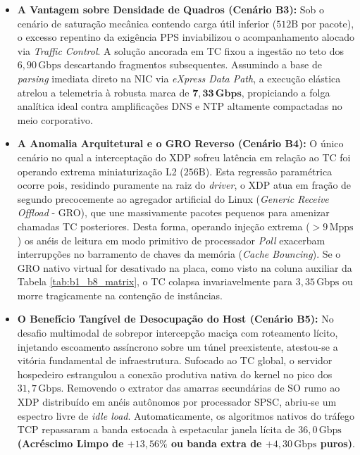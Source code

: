 \documentclass[conference]{IEEEtran}
\begin{document}
\begin{itemize}
    \item \textbf{A Vantagem sobre Densidade de Quadros (Cenário B3):} Sob o cenário de saturação mecânica contendo carga útil inferior ($512\text{B}$ por pacote), o excesso repentino da exigência PPS inviabilizou o acompanhamento alocado via \textit{Traffic Control}. A solução ancorada em TC fixou a ingestão no teto dos $6,90\,\text{Gbps}$ descartando fragmentos subsequentes. Assumindo a base de \textit{parsing} imediata direto na NIC via \textit{eXpress Data Path}, a execução elástica atrelou a telemetria à robusta marca de $\mathbf{7,33\,\text{Gbps}}$, propiciando a folga analítica ideal contra amplificações DNS e NTP altamente compactadas no meio corporativo.
    \item \textbf{A Anomalia Arquitetural e o GRO Reverso (Cenário B4):} O único cenário no qual a interceptação do XDP sofreu latência em relação ao TC foi operando extrema miniaturização L2 ($256\text{B}$). Esta regressão paramétrica ocorre pois, residindo puramente na raiz do \textit{driver}, o XDP atua em fração de segundo precocemente ao agregador artificial do Linux (\textit{Generic Receive Offload} - GRO), que une massivamente pacotes pequenos para amenizar chamadas TC posteriores. Desta forma, operando injeção extrema ($> 9\,\text{Mpps}$) os anéis de leitura em modo primitivo de processador \textit{Poll} exacerbam interrupções no barramento de chaves da memória (\textit{Cache Bouncing}). Se o GRO nativo virtual for desativado na placa, como visto na coluna auxiliar da Tabela \ref{tab:b1_b8_matrix}, o TC colapsa invariavelmente para $3,35\,\text{Gbps}$ ou morre tragicamente na contenção de instâncias.
    \item \textbf{O Benefício Tangível de Desocupação do Host (Cenário B5):} No desafio multimodal de sobrepor intercepção maciça com roteamento lícito, injetando escoamento assíncrono sobre um túnel preexistente, atestou-se a vitória fundamental de infraestrutura. Sufocado ao TC global, o servidor hospedeiro estrangulou a conexão produtiva nativa do kernel no pico dos $31,7\,\text{Gbps}$. Removendo o extrator das amarras secundárias de SO rumo ao XDP distribuído em anéis autônomos por processador SPSC, abriu-se um espectro livre de \textit{idle load}. Automaticamente, os algoritmos nativos do tráfego TCP repassaram a banda estocada à espetacular janela lícita de \textbf{$36,0\,\text{Gbps}$ (Acréscimo Limpo de $+13,56\%$ ou banda extra de $+4,30\,\text{Gbps}$ puros)}. 
\end{itemize}
\end{document}
